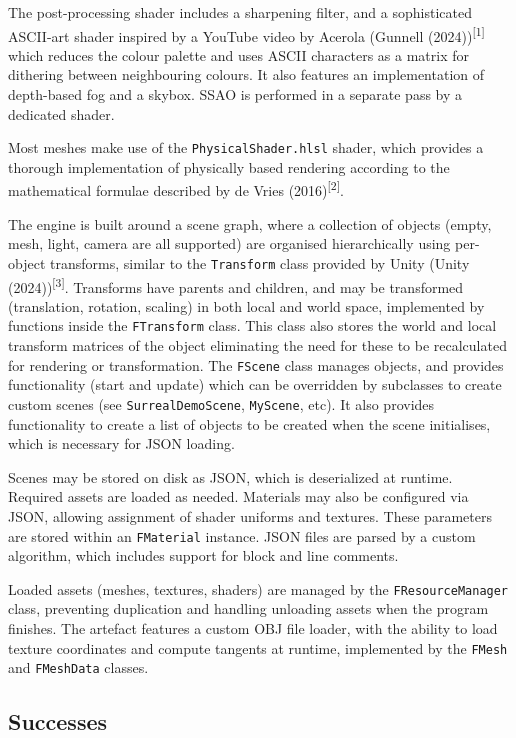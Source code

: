 \documentclass[
]{article}
\begin{document}
{The post-processing shader includes a sharpening filter, and a
sophisticated ASCII-art shader inspired by a YouTube video by Acerola
(Gunnell (2024))\textsuperscript{{[}1{]}} which reduces the colour palette and uses ASCII characters as a matrix for dithering between neighbouring colours. It also features an
implementation of depth-based fog and a skybox. SSAO is performed in a
separate pass by a dedicated shader.

Most meshes make use of the \texttt{PhysicalShader.hlsl} shader, which
provides a thorough implementation of physically based rendering
according to the mathematical formulae described by de Vries
(2016)\textsuperscript{{[}2{]}}.

The engine is built around a scene graph, where a collection of
objects (empty, mesh, light, camera are all supported) are organised
hierarchically using per-object transforms, similar to the
\texttt{Transform} class provided by Unity (Unity
(2024))\textsuperscript{{[}3{]}}. Transforms have parents and children,
and may be transformed (translation, rotation, scaling) in both local
and world space, implemented by functions inside the \texttt{FTransform} class. This class also stores the world and local transform matrices of the object eliminating the need for these to be recalculated for rendering or transformation. The
\texttt{FScene} class manages objects, and provides functionality (start
and update) which can be overridden by subclasses to create custom
scenes (see \texttt{SurrealDemoScene}, \texttt{MyScene}, etc). It also provides functionality to create a list of objects to be created when the scene initialises, which is necessary for JSON loading.

Scenes may be stored on disk as JSON, which is deserialized at runtime.
Required assets are loaded as needed. Materials may also be configured
via JSON, allowing assignment of shader uniforms and textures. These
parameters are stored within an \texttt{FMaterial} instance. JSON files
are parsed by a custom algorithm, which includes support for block and
line comments.

Loaded assets (meshes, textures, shaders) are managed by the
\texttt{FResourceManager} class, preventing duplication and handling
unloading assets when the program finishes. The artefact features a
custom OBJ file loader, with the ability to load texture coordinates and
compute tangents at runtime, implemented by the \texttt{FMesh} and
\texttt{FMeshData} classes.

\hypertarget{successes}{%
\subsection{Successes}\label{successes}}

}
\end{document}
